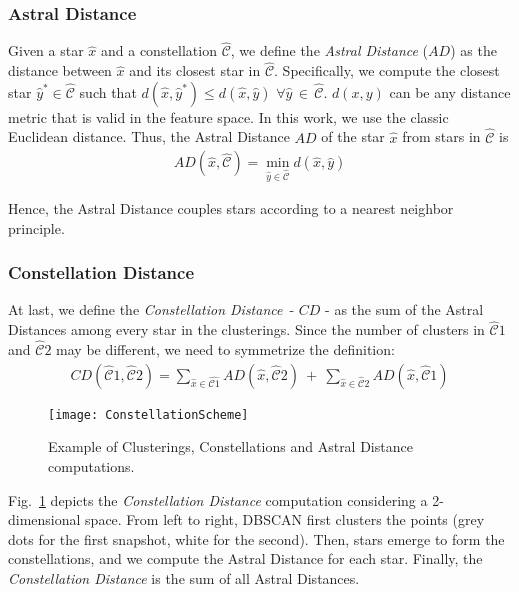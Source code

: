 \documentclass{acm_proc_article-sp}
\newcommand{\distance}{\textit{Constellation Distance}\xspace}
\begin{document}
\subsubsection{Astral Distance}
Given a star $\hat{x}$ and a constellation $\hat{\mathcal{C}}$, we define the {\it Astral Distance} ($AD$) 
as the distance between $\hat{x}$ and its closest star in $\hat{\mathcal{C}}$.
Specifically, we compute the closest star $\hat{y}^* \in \hat{\mathcal{C}}$  such that $d(\hat{x},\hat{y}^*) \leq d(\hat{x},\hat{y}) \,\, \forall \hat{y} \, \in \, \hat{\mathcal{C}}$. $d(x,y)$ can be any distance metric that is valid in the feature space. In this work, we use the classic Euclidean distance.
Thus, the Astral Distance $AD$ of the star $\hat{x}$ from stars in $\hat{\mathcal{C}}$ is
\begin{eqnarray}
 AD(\hat{x}, \hat{\mathcal{C}}) = \min_{\hat{y} \in \hat{\mathcal{C}}} d(\hat{x}, \hat{y})
\end{eqnarray}

Hence, the Astral Distance couples stars according to a nearest neighbor principle. 

\subsubsection{Constellation Distance} At last, we define the \distance\ - $CD$ - as the sum of the Astral Distances among every star in the clusterings. Since the number of clusters in $\hat{\mathcal{C}}1$ and $\hat{\mathcal{C}}2$ may be different, we need to symmetrize the definition:
\begin{equation}
\begin{split}
CD(\hat{\mathcal{C}}1,\hat{\mathcal{C}}2) =
     \sum_{\hat{x}\in \hat{\mathcal{C}1}} AD(\hat{x}, \hat{\mathcal{C}}2)\  + \ 
             \sum_{\hat{x}\in \hat{\mathcal{C}}2} AD(\hat{x}, \hat{\mathcal{C}}1)
\end{split}
\label{eq:constDist}
\end{equation}

\begin{figure}[t!]
\centering
    \texttt{[image: ConstellationScheme]}
    \caption{Example of Clusterings, Constellations and Astral Distance computations.}
    \label{fig:distance}
\end{figure}

Fig.~\ref{fig:distance} depicts the \distance computation considering a 2-dimensional space. From left to right, DBSCAN first clusters the points (grey dots for the first snapshot, white for the second). Then, stars emerge to form the constellations, and we compute the Astral Distance for each star. Finally, the \distance is the sum of all Astral Distances.
\end{document}
